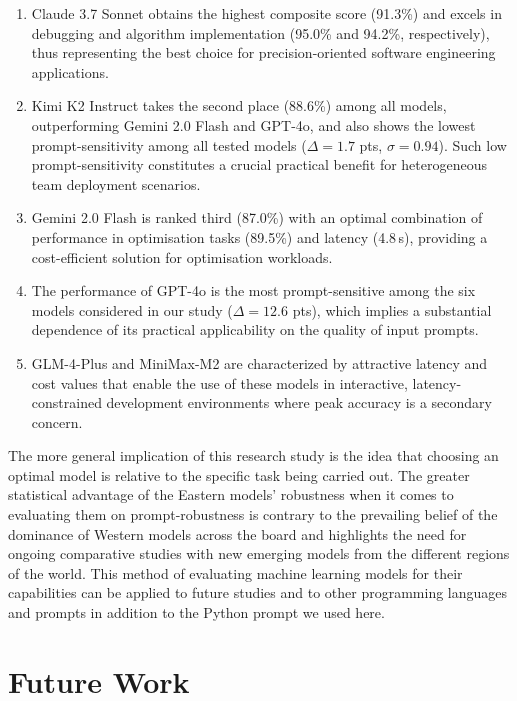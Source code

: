 \documentclass[conference]{IEEEtran}
\begin{document}
\begin{enumerate}
  \item Claude 3.7 Sonnet obtains the highest composite score (91.3\%) and excels in debugging and algorithm implementation (95.0\% and 94.2\%, respectively), thus representing the best choice for precision-oriented software engineering applications.

  \item Kimi K2 Instruct takes the second place (88.6\%) among all models, outperforming Gemini 2.0 Flash and GPT-4o, and also shows the lowest prompt-sensitivity among all tested models ($\Delta = 1.7$ pts, $\sigma = 0.94$). Such low prompt-sensitivity constitutes a crucial practical benefit for heterogeneous team deployment scenarios.

  \item Gemini 2.0 Flash is ranked third (87.0\%) with an optimal combination of performance in optimisation tasks (89.5\%) and latency (4.8\,s), providing a cost-efficient solution for optimisation workloads.

  \item The performance of GPT-4o is the most prompt-sensitive among the six models considered in our study ($\Delta = 12.6$ pts), which implies a substantial dependence of its practical applicability on the quality of input prompts.

  \item GLM-4-Plus and MiniMax-M2 are characterized by attractive latency and cost values that enable the use of these models in interactive, latency-constrained development environments where peak accuracy is a secondary concern.
\end{enumerate}

The more general implication of this research study is the idea that choosing an optimal model is relative to the specific task being carried out. The greater statistical advantage of the Eastern models' robustness when it comes to evaluating them on prompt-robustness is contrary to the prevailing belief of the dominance of Western models across the board and highlights the need for ongoing comparative studies with new emerging models from the different regions of the world. This method of evaluating machine learning models for their capabilities can be applied to future studies and to other programming languages and prompts in addition to the Python prompt we used here.

\section{Future Work}
\label{sec:future}
\end{document}
